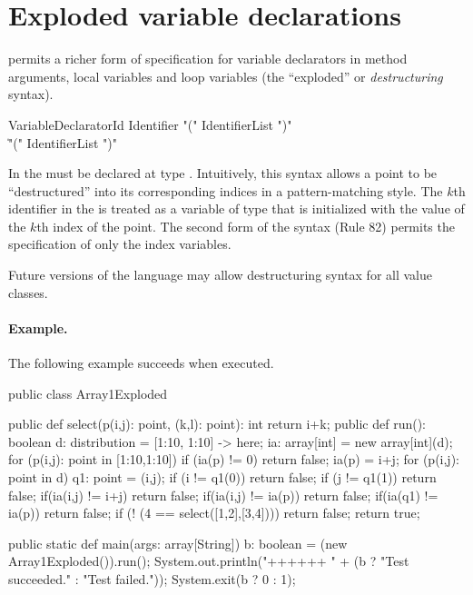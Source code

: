 \section{Exploded variable declarations}\label{exploded-syntax}

\Xten{} permits a richer form of specification for variable
declarators in method arguments, local variables and loop variables
(the ``exploded'' or {\em destructuring} syntax).
\begin{grammar}
VariableDeclaratorId \:
           Identifier \xcd"(" IdentifierList \xcd")" \\
           \| \xcd"(" IdentifierList \xcd")" \\
\end{grammar}
In \XtenCurrVer{} the  must be declared at
type . Intuitively, this syntax allows a
point to be ``destructured'' into its corresponding  
indices in a pattern-matching style.
The $k$th identifier in the  is treated as a  variable of type 
that is initialized with the value of the $k$th index of the point. 
The second form of the syntax (Rule 82) permits the specification of only
the index variables.

Future versions of the language may allow destructuring syntax for all
value classes.

\paragraph{Example.}
The following example succeeds when executed.
\begin{xten}
public class Array1Exploded {
  public def select(p(i,j): point, (k,l): point): int {
      return i+k;
  }
  public def run(): boolean {
    d: distribution = [1:10, 1:10] -> here;
    ia: array[int] = new array[int](d);
    for (p(i,j): point in [1:10,1:10]) {
        if (ia(p) != 0) return false;
        ia(p) = i+j;
    }
    for (p(i,j): point in d) {
      q1: point = (i,j);
      if (i != q1(0)) return false;
      if (j != q1(1)) return false;
      if(ia(i,j) != i+j) return false;
      if(ia(i,j) != ia(p)) return false;
      if(ia(q1)  != ia(p)) return false;
    }
    if (! (4 == select([1,2],[3,4]))) return false;
    return true;
  }
        
  public static def main(args: array[String]) {
     b: boolean = (new Array1Exploded()).run();
     System.out.println("++++++ "
                        + (b ? "Test succeeded."
                             : "Test failed."));
     System.exit(b ? 0 : 1);
  }
}
\end{xten}

 \par  %




